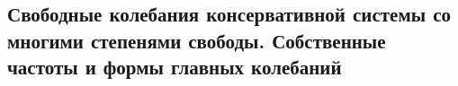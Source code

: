 

\subsection{Свободные колебания консервативной системы со многими степенями свободы. Собственные частоты и формы главных колебаний}



